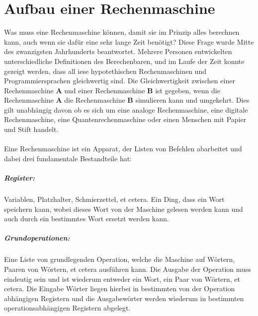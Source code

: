 \documentclass[11pt,a4paper,leqno]{report}
\numberwithin{equation}{chapter}
\begin{document}
\chapter{Aufbau einer Rechenmaschine}
Was muss eine Rechenmaschine k\"onnen, damit sie im Prinzip alles berechnen kann, auch wenn sie daf\"ur eine sehr lange Zeit ben\"otigt? Diese Frage wurde Mitte des zwanzigsten Jahrhunderts beantwortet. Mehrere Personen entwickelten unterschiedliche Definitionen des Berechenbaren, und im Laufe der Zeit konnte gezeigt werden, dass all 
iese hypotethischen Rechenmaschinen und Programmiersprachen gleichwertig sind. Die Gleichwertigkeit zwischen einer Rechenmaschine \textbf{A} und einer Rechenmaschine \textbf{B} ist gegeben, wenn die\\ Rechenmaschine \textbf{A} die Rechenmaschine \textbf{B} simulieren kann und umgekehrt. Dies gilt unabh\"angig davon ob es sich um eine analoge Rechenmaschine, eine digitale Rechenmaschine, eine Quantenrechenmaschine oder einen Menschen mit Papier und Stift handelt.\\
\\
Eine Rechenmaschine ist ein Apparat, der Listen von Befehlen abarbeitet und dabei drei fundamentale Bestandteile hat:
\paragraph{Register:} Variablen, Platzhalter, Schmierzettel, et cetera. Ein Ding, dass ein Wort speichern kann, wobei dieses Wort von der Maschine gelesen werden kann und auch durch ein bestimmtes Wort ersetzt werden kann.
\paragraph{Grundoperationen:} Eine Liste von grundlegenden Operation, welche die Maschine auf W\"ortern, Paaren von W\"ortern, et cetera ausf\"uhren kann. Die Ausgabe der Operation muss eindeutig sein und ist wiederum entweder ein Wort, ein Paar von W\"ortern, et cetera. Die Eingabe W\"orter liegen hierbei in bestimmten von der Operation abh\"angigen Registern und die Ausgabew\"orter werden wiederum in bestimmten operationsabh\"angigen Registern abgelegt.
\end{document}
